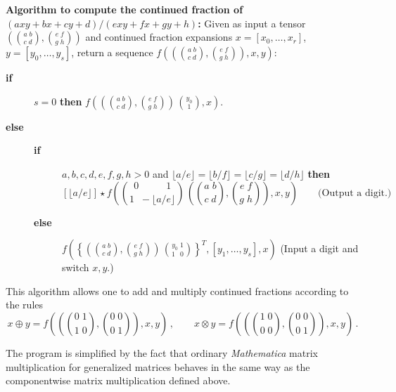 \medskip\noindent
\begin{boxedtext}
\noindent
{\bf Algorithm to compute the continued fraction of 
 $(a xy + b x + c y + d)/(e xy + f x + g y + h)$:}
Given as input a tensor 
$\left({a\; b\choose c \; d}, {e\; f\choose g \; h }\right)$
and continued fraction expansions 
$x = [x_0,\ldots,x_r]$, $y=[y_0,\ldots,y_s]$, return a sequence
$f\left(\left({a\; b\choose c \; d}, {e\; f\choose g \; h }\right),x,y\right)$:

\begin{description}

\item[{\bf if}]
$s = 0$ {\bf then} 
$f\left(\left({a\; b\choose c \; d}, {e\; f\choose g \; h }\right)\, 
   {y_0 \choose 1}, x\right)$. 

\item[{\bf else}]

\begin{description}

\item[{\bf if}]
 $a,b,c,d,e,f,g,h > 0$ and 
$\lfloor a/e\rfloor= \lfloor b/f\rfloor= 
 \lfloor c/g\rfloor =\lfloor d/h\rfloor$ {\bf then} 
$$
\textstyle 
[\lfloor a/e\rfloor]\star 
f\left({0\;\;\;\;\;\;\;\;\; \; 1\choose 1 \;\; -\lfloor a/e\rfloor } \, 
 \left({a \; b\choose c \; d}, {e \; f\choose g \; h}\right), 
        x, y\right) \qquad\mbox{(Output a digit.)}
$$ 

\item[{\bf else}]
$f\left(
\left\{\left({a \; b\choose c \; d}, {e \; f\choose g \; h}\right)
\, {y_0\;  1\choose 1\;\;\, 0}\right\}^T,
      [y_1, \ldots,y_s], x\right)$ \quad (Input a digit and switch $x,y$.)
\end{description}
\end{description}
\end{boxedtext}

\medskip\noindent
This algorithm allows one to add and multiply continued fractions
according to the rules
$$
x\oplus y  = \textstyle 
f\left(\left({0 \; 1\choose 1\; 0}, {0 \; 0 \choose 0 \; 1}\right), x,y
   \right)\,,\qquad
x\otimes y  = \textstyle 
f\left(\left({1 \; 0\choose 0\; 0}, {0 \; 0 \choose 0 \; 1}\right), x,y
   \right)\,.
$$

\medskip\noindent
The program is simplified by the fact that ordinary {\sl
Mathematica\/} matrix multiplication for generalized matrices behaves
in the same way as the componentwise matrix multiplication defined
above.

